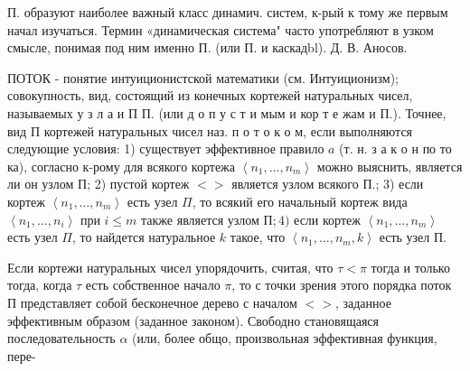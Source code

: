 \documentclass[10pt]{article}
\begin{document}
П. образуют наиболее важный класс динамич. систем, к-рый к тому же первым начал изучаться. Термин «динамическая система" часто употребляют в узком смысле, понимая под ним именно П. (или П. и каскадbl). Д. В. Аносов.



ПОТОК - понятие интуиционистской математики (см. Интуиционизм); совокупность, вид, состоящий из конечных кортежей натуральных чисел, называемых у з л а и П П. (или д о п у с т и мым и кор т е жам и П.). Точнее, вид П кортежей натуральных чисел наз. п о т о к о м, если выполняются следующие условия: 1) существует эффективное правило $a$ (т. н. з а к о н по то ка), согласно к-рому для всякого кортежа $\left\langle n_{1}, \ldots, n_{m}\right\rangle$ можно выяснить, является ли он узлом П; 2) пустой кортеж $<>$ является узлом всякого П.; 3) если кортеж $\left\langle n_{1}, \ldots, n_{m}\right\rangle$ есть узел $\Pi$, то всякий его начальный кортеж вида $\left\langle n_{1}, \ldots, n_{i}\right\rangle$ при $i \leqslant m$ также является узлом $П ; 4)$ если кортеж $\left\langle n_{1}, \ldots, n_{m}\right\rangle$ есть узел $\Pi$, то найдется натуральное $k$ такое, что $\left\langle n_{1}, \ldots, n_{m}, k\right\rangle$ есть узел П.



Если кортежи натуральных чисел упорядочить, считая, что $\tau<\pi$ тогда и только тогда, когда $\tau$ есть собственное начало $\pi$, то с точки зрения этого порядка поток П представляет собой бесконечное дерево с началом $<>$, заданное эффективным образом (заданное законом). Свободно становящаяся последовательность $\alpha$ (или, более общо, произвольная эффективная функция, пере-
\end{document}
